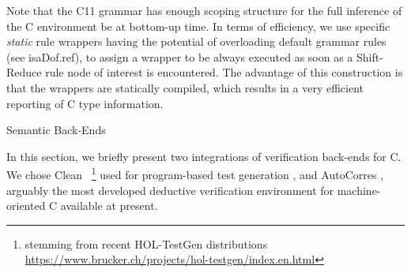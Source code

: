 \begin{isabellebody}
\begin{isamarkuptext}
Note that the C11 grammar has enough scoping structure for the full inference of the C environment
 be at bottom-up time. In terms of efficiency, we use specific
\emph{static} rule wrappers having the potential of overloading default grammar rules (see \csname isaDof.ref), to assign a wrapper to be always executed as soon as a Shift-Reduce
rule node of interest is encountered. The advantage of this construction is that the wrappers are
statically compiled, which results in a very efficient reporting of C type information.%
\end{isamarkuptext}\isamarkuptrue%
%
\begin{isamarkupsection*}%
[label = {backends},type = {scholarly_paper.technical}, args={label = {backends},type = {scholarly_paper.technical}, scholarly_paper.text_section.main_author = {@{docitem ''bu''}}, Isa_COL.text_element.level = {}, Isa_COL.text_element.referentiable = {False}, Isa_COL.text_element.variants = {{STR ''outline'', STR ''document''}}, scholarly_paper.text_section.fixme_list = {}, Isa_COL.text_element.level = {}, scholarly_paper.technical.definition_list = {}}]Semantic Back-Ends%
\end{isamarkupsection*}\isamarkuptrue%
%
\begin{isamarkuptext}%
In this section, we briefly present two integrations of verification back-ends for C. We
chose Clean \cite{journals/afp/TuongW19}~\footnote{stemming from recent HOL-TestGen distributions
    \url{https://www.brucker.ch/projects/hol-testgen/index.en.html}} used
for program-based test generation \cite{DBLP:conf/tap/Keller18}, and AutoCorres \cite{DBLP:conf/pldi/GreenawayLAK14}, arguably the most developed deductive verification environment
for machine-oriented C available at present.


\end{isamarkuptext}
\end{isabellebody}

